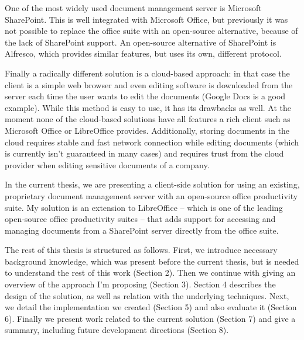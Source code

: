 One of the most widely used document management server is Microsoft
SharePoint\cite{sharepoint}. This is well integrated with Microsoft Office, but
previously it was not possible to replace the office suite with an open-source
alternative, because of the lack of SharePoint support. An open-source
alternative of SharePoint is Alfresco\cite{alfresco}, which provides similar
features, but uses its own, different protocol.

Finally a radically different solution is a cloud-based approach: in that case
the client is a simple web browser and even editing software is downloaded from
the server each time the user wants to edit the documents (Google
Docs\cite{google-docs} is a good example). While this method is easy to use, it
has its drawbacks as well. At the moment none of the cloud-based solutions have
all features a rich client such as Microsoft Office or LibreOffice provides.
Additionally, storing documents in the cloud requires stable and fast network
connection while editing documents (which is currently isn't guaranteed in many
cases) and requires trust from the cloud provider when editing sensitive
documents of a company.

In the current thesis, we are presenting a client-side solution for using an
existing, proprietary document management server with an open-source office
productivity suite. My solution is an extension to LibreOffice -- which is one
of the leading open-source office productivity suites -- that adds support for
accessing and managing documents from a SharePoint server directly from the
office suite.

The rest of this thesis is structured as follows. First, we introduce necessary
background knowledge, which was present before the current thesis, but is
needed to understand the rest of this work (Section 2). Then we continue with
giving an overview of the approach I'm proposing (Section 3). Section 4
describes the design of the solution, as well as relation with the underlying
techniques. Next, we detail the implementation we created (Section 5) and also
evaluate it (Section 6). Finally we present work related to the current
solution (Section 7) and give a summary, including future development
directions (Section 8).
